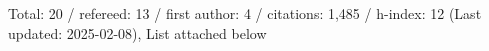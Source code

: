 Total: 20 / refereed: 13 / first author: 4 / citations: 1,485 / h-index: 12 (Last updated: 2025-02-08), List attached below